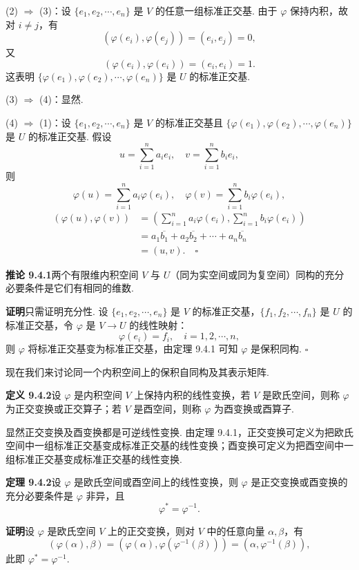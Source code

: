 \documentclass[UTF8, 12pt, fontset=fandol, oneside]{ctexart}
\begin{document}
(2) $\Rightarrow$ (3)：设 $\{e_1,e_2,\cdots,e_n\}$ 是 $V$ 的任意一组标准正交基. 由于 $\varphi$ 保持内积，故对 $i\ne j$，有
\[
  (\varphi(e_i),\varphi(e_j))=(e_i,e_j)=0,
\]
又
\[
  (\varphi(e_i),\varphi(e_i))=(e_i,e_i)=1.
\]
这表明 $\{\varphi(e_1),\varphi(e_2),\cdots,\varphi(e_n)\}$ 是 $U$ 的标准正交基.

(3) $\Rightarrow$ (4)：显然.

(4) $\Rightarrow$ (1)：设 $\{e_1,e_2,\cdots,e_n\}$ 是 $V$ 的标准正交基且 $\{\varphi(e_1),\varphi(e_2),\cdots,\varphi(e_n)\}$ 是 $U$ 的标准正交基. 假设
\[
  u=\sum_{i=1}^n a_ie_i,\quad v=\sum_{i=1}^n b_ie_i,
\]
则
\[
  \varphi(u)=\sum_{i=1}^n a_i\varphi(e_i),\quad
  \varphi(v)=\sum_{i=1}^n b_i\varphi(e_i),
\]
\[
\begin{aligned}
  (\varphi(u),\varphi(v))
  &=
  \left(\sum_{i=1}^n a_i\varphi(e_i),\sum_{i=1}^n b_i\varphi(e_i)\right)\\
  &=a_1\overline{b_1}+a_2\overline{b_2}+\cdots+a_n\overline{b_n}\\
  &=(u,v). \quad \square
\end{aligned}
\]

\noindent\textbf{推论 9.4.1}\quad 两个有限维内积空间 $V$ 与 $U$（同为实空间或同为复空间）同构的充分必要条件是它们有相同的维数.

\noindent\textbf{证明}\quad 只需证明充分性. 设 $\{e_1,e_2,\cdots,e_n\}$ 是 $V$ 的标准正交基，$\{f_1,f_2,\cdots,f_n\}$ 是 $U$ 的标准正交基，令 $\varphi$ 是 $V\to U$ 的线性映射：
\[
  \varphi(e_i)=f_i,\quad i=1,2,\cdots,n,
\]
则 $\varphi$ 将标准正交基变为标准正交基，由定理 9.4.1 可知 $\varphi$ 是保积同构. $\square$

现在我们来讨论同一个内积空间上的保积自同构及其表示矩阵.

\noindent\textbf{定义 9.4.2}\quad 设 $\varphi$ 是内积空间 $V$ 上保持内积的线性变换，若 $V$ 是欧氏空间，则称 $\varphi$ 为正交变换或正交算子；若 $V$ 是酉空间，则称 $\varphi$ 为酉变换或酉算子.

显然正交变换及酉变换都是可逆线性变换. 由定理 9.4.1，正交变换可定义为把欧氏空间中一组标准正交基变成标准正交基的线性变换；酉变换可定义为把酉空间中一组标准正交基变成标准正交基的线性变换.

\noindent\textbf{定理 9.4.2}\quad 设 $\varphi$ 是欧氏空间或酉空间上的线性变换，则 $\varphi$ 是正交变换或酉变换的充分必要条件是 $\varphi$ 非异，且
\[
  \varphi^*=\varphi^{-1}.
\]

\noindent\textbf{证明}\quad 设 $\varphi$ 是欧氏空间 $V$ 上的正交变换，则对 $V$ 中的任意向量 $\alpha,\beta$，有
\[
  (\varphi(\alpha),\beta)=(\varphi(\alpha),\varphi(\varphi^{-1}(\beta)))=(\alpha,\varphi^{-1}(\beta)),
\]
此即 $\varphi^*=\varphi^{-1}$.
\end{document}
